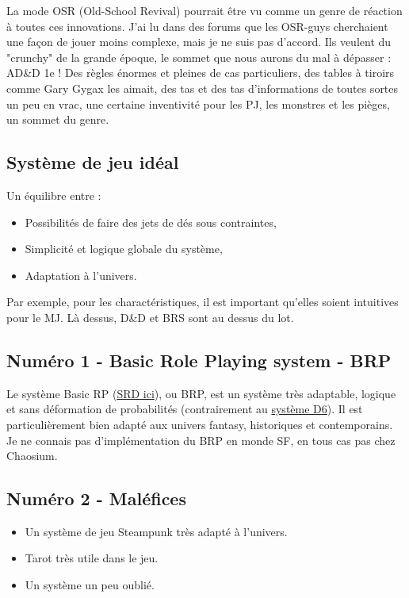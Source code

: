 \documentclass[a4paper, 11pt, twoside]{article}
\begin{document}
La mode OSR (Old-School Revival) pourrait être vu comme un genre de réaction à toutes ces innovations. J'ai lu dans des forums que les OSR-guys cherchaient une façon de jouer moins complexe, mais je ne suis pas d'accord. Ils veulent du "crunchy" de la grande époque, le sommet que nous aurons du mal à dépasser : AD\&D 1e ! Des règles énormes et pleines de cas particuliers, des tables à tiroirs comme Gary Gygax les aimait, des tas et des tas d'informations de toutes sortes un peu en vrac, une certaine inventivité pour les PJ, les monstres et les pièges, un sommet du genre.

\subsection{Système de jeu idéal}
\label{sec:org0cba9fb}

Un équilibre entre :
\begin{itemize}
\item Possibilités de faire des jets de dés sous contraintes,
\item Simplicité et logique globale du système,
\item Adaptation à l'univers.
\end{itemize}

Par exemple, pour les charactéristiques, il est important qu'elles soient intuitives pour le MJ. Là dessus, D\&D et BRS sont au dessus du lot.

\subsection{Numéro 1 - Basic Role Playing system - BRP}
\label{sec:org1b0620a}

Le système Basic RP (\href{https://www.chaosium.com/brp-system-reference-document/}{SRD ici}), ou BRP, est un système très adaptable, logique et sans déformation de probabilités (contrairement au \href{https://github.com/orey/jdr/tree/master/D6-System}{système D6}). Il est particulièrement bien adapté aux univers fantasy, historiques et contemporains. Je ne connais pas d'implémentation du BRP en monde SF, en tous cas pas chez Chaosium.

\subsection{Numéro 2 - Maléfices}
\label{sec:org71fb1a0}

\begin{itemize}
\item Un système de jeu Steampunk très adapté à l'univers.
\item Tarot très utile dans le jeu.
\item Un système un peu oublié.
\end{itemize}
\end{document}
